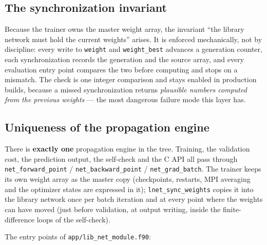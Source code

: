 \documentclass[10pt,a4paper]{article}
\newcommand{\code}[1]{\texttt{#1}}
\begin{document}
\subsection{The synchronization invariant}

Because the trainer owns the master weight array, the invariant
``the library network must hold the current weights'' arises. It is
enforced mechanically, not by discipline: every write to \code{weight}
and \code{weight\_best} advances a generation counter, each
synchronization records the generation and the source array, and every
evaluation entry point compares the two before computing and stops on
a mismatch. The check is one integer comparison and stays enabled in
production builds, because a missed synchronization returns
\emph{plausible numbers computed from the previous weights} --- the
most dangerous failure mode this layer has.

\subsection{Uniqueness of the propagation engine}

There is \textbf{exactly one} propagation engine in the tree.
Training, the validation cost, the prediction output, the self-check
and the C API all pass through \code{net\_forward\_point} /
\code{net\_backward\_point} / \code{net\_grad\_batch}. The trainer
keeps its own weight array as the master copy (checkpoints, restarts,
MPI averaging and the optimizer states are expressed in it);
\code{lnet\_sync\_weights} copies it into the library network once per
batch iteration and at every point where the weights can have moved
(just before validation, at output writing, inside the
finite-difference loops of the self-check).

The entry points of \code{app/lib\_net\_module.f90}:
\end{document}
